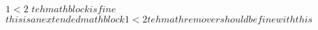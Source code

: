 \documentclass[12pt]{article}
\begin{document}
$1<2$ $teh math block is fine$
$ this is an extended math block
1 < 2
teh math remover should be fine with this
$
\end{document}
